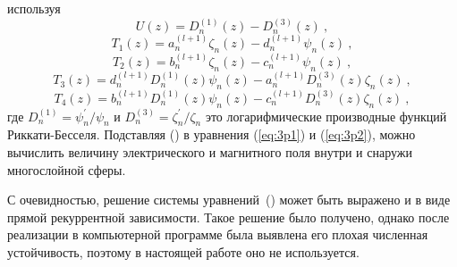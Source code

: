 используя
\begin{equation*}
  U(z) =    {D^{(1)}_{n}}(z) - {D^{(3)}_{n}}(z)\:,
\end{equation*}
\begin{equation*}
  T_1(z) =   a^{(l+1)}_{n}  \zeta_{n}(z) 
           - d^{(l+1)}_{n}  \psi_{n}(z)\:,
\end{equation*}
\begin{equation*}
  T_2(z) =   b^{(l+1)}_{n}  \zeta_{n}(z) 
           - c^{(l+1)}_{n}  \psi_{n}(z)\:,
\end{equation*}
\begin{equation*}
  T_3(z) =  d^{(l+1)}_{n}  D^{(1)}_{n}(z)  \psi_{n}(z) 
          - a^{(l+1)}_{n}  D^{(3)}_{n}(z)  \zeta_{n} (z)\:,
\end{equation*}
\begin{equation*}
  T_4(z) =  b^{(l+1)}_{n}  D^{(1)}_{n}(z)  \psi_{n}(z) 
          - c^{(l+1)}_{n}  D^{(3)}_{n}(z)  \zeta_{n} (z)\:,
\end{equation*}
где  $D^{(1)}_{n} = \psi^{\prime}_{n}/\psi_{n}$ и
$D^{(3)}_{n} = \zeta^{\prime}_{n}/\zeta_{n}$ это логарифмические
производные функций Риккати-Бесселя. Подставляя
() в уравнения (\ref{eq:3p1}) и
(\ref{eq:3p2}), можно вычислить величину электрического и магнитного
поля внутри и снаружи многослойной сферы.

С очевидностью, решение системы
уравнений~() может быть
выражено и в виде прямой рекуррентной зависимости. Такое решение было
получено, однако после реализации в компьютерной программе была
выявлена его плохая численная устойчивость, поэтому в настоящей работе
оно не используется.

